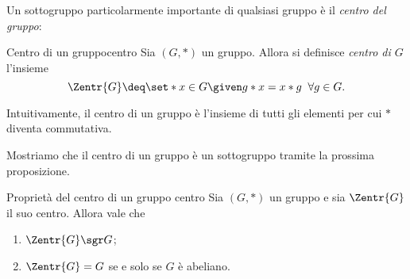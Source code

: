 Un sottogruppo particolarmente importante di qualsiasi gruppo è il \emph{centro del gruppo}:

\begin{definition}
    {Centro di un gruppo}{centro}
    Sia $(G, \ast)$ un gruppo. Allora si definisce \emph{centro di $G$} l'insieme \[
        \Zentr{G} \deq \set*{x \in G \given g\ast x = x\ast g \;\;\forall g \in G}.    
    \]
\end{definition}

Intuitivamente, il centro di un gruppo è l'insieme di tutti gli elementi per cui $\ast$ diventa commutativa.

Mostriamo che il centro di un gruppo è un sottogruppo tramite la prossima proposizione.

\begin{proposition}
    {Proprietà del centro di un gruppo}
    {centro}
    Sia $(G, \ast)$ un gruppo e sia $\Zentr{G}$ il suo centro.
    Allora vale che \begin{enumerate}[label={(\roman*)}]
        \item $\Zentr{G} \sgr G$;
        \item $\Zentr{G} = G$ se e solo se $G$ è abeliano.
    \end{enumerate}
\end{proposition}
